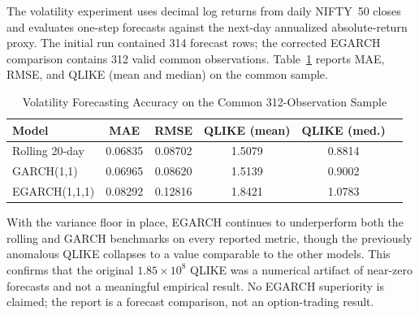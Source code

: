 \documentclass[journal]{IEEEtran}
\begin{document}
The volatility experiment uses decimal log returns from daily NIFTY~50 closes and evaluates one-step forecasts against the next-day annualized absolute-return proxy. The initial run contained 314 forecast rows; the corrected EGARCH comparison contains 312 valid common observations. Table~\ref{tab:vol_forecast} reports MAE, RMSE, and QLIKE (mean and median) on the common sample.

\begin{table}[!t]
\renewcommand{\arraystretch}{1.2}
\caption{Volatility Forecasting Accuracy on the Common 312-Observation Sample}
\label{tab:vol_forecast}
\centering
\begin{tabular}{lccccc}
\toprule
\textbf{Model} & \textbf{MAE} & \textbf{RMSE} & \textbf{QLIKE (mean)} & \textbf{QLIKE (med.)} \\
\midrule
Rolling 20-day & 0.06835 & 0.08702 & 1.5079 & 0.8814 \\
GARCH(1,1)     & 0.06965 & 0.08620 & 1.5139 & 0.9002 \\
EGARCH(1,1,1)  & 0.08292 & 0.12816 & 1.8421 & 1.0783 \\
\bottomrule
\end{tabular}
\end{table}

With the variance floor in place, EGARCH continues to underperform both the rolling and GARCH benchmarks on every reported metric, though the previously anomalous QLIKE collapses to a value comparable to the other models. This confirms that the original $1.85\times10^{8}$ QLIKE was a numerical artifact of near-zero forecasts and not a meaningful empirical result. No EGARCH superiority is claimed; the report is a forecast comparison, not an option-trading result.
\end{document}
